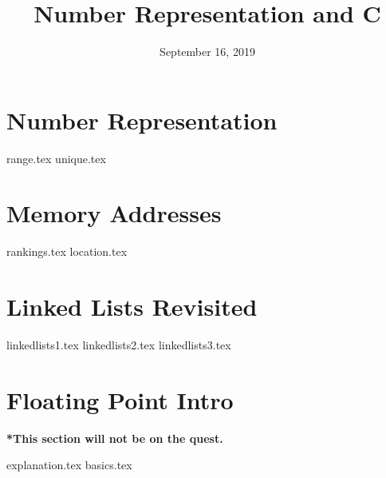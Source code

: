\documentclass[11pt]{exam}
\title{Number Representation and C}
\date{September 16, 2019}
\begin{document}
\maketitle

\section{Number Representation}
\begin{questions}
{range.tex}
{unique.tex}
\end{questions}
\newpage

\section{Memory Addresses}
\begin{questions}
{rankings.tex}
{location.tex}
\end{questions}

\section{Linked Lists Revisited}
\begin{questions}
{linkedlists1.tex}
{linkedlists2.tex}
{linkedlists3.tex}
\end{questions}
\newpage

\section{Floating Point Intro}
\textbf{*This section will not be on the quest.}
\begin{questions}
{explanation.tex}
{basics.tex}
\end{questions}
\newpage
\end{document}
